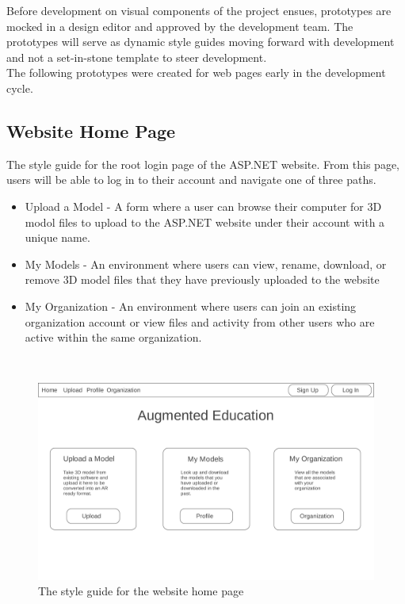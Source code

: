 \hspace{7mm}
Before development on visual components of the project ensues, prototypes are mocked in a
design editor and approved by the development team.  The prototypes will serve
as dynamic style guides moving forward with development and not a set-in-stone template
to steer development.\\

The following prototypes were created for web pages early in the development cycle.

\subsection{Website Home Page}
    \hspace{7mm} The style guide for the root login page of the ASP.NET website.
    From this page, users will be able to log in to their account and navigate 
    one of three paths.
        \begin{itemize} 
            \item Upload a Model - %
                A form where a user can browse their computer for 3D modol files to
                upload to the ASP.NET website under their account with a unique name. 
            \item My Models - %
                An environment where users can view, rename, download, or remove
                3D model files that they have previously uploaded to the website
            \item My Organization -%
                An environment where users can join an existing organization account
                or view files and activity from other users who are active within 
                the same organization.
        \end{itemize}
    \ \\
    \label{fig:proto_web_home}
    \begin{figure}[H]
        \centering \includegraphics[width=0.6\linewidth]{Home}
        \caption{The style guide for the website home page}
    \end{figure}


